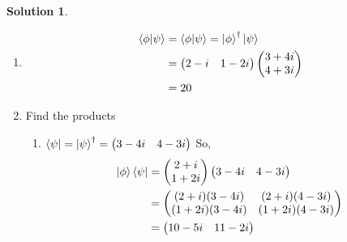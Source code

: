 \documentclass[10pt]{article}
\theoremstyle{definition}
\newtheorem{soln}{Solution}
\begin{document}
\begin{soln} ~
  \begin{enumerate}[label=(\alph*)]
    \item \begin{align*}
            \braket{\phi}{\psi} & = \braket{\phi}{\psi} = \ket{\phi}^\dagger \ket{\psi} \\
                                & = \begin{pmatrix}
                                      2-i & 1-2i
                                    \end{pmatrix}
            \begin{pmatrix}
              3+4i \\
              4+3i
            \end{pmatrix}                                                              \\
                                & = 20
          \end{align*}
    \item Find the products \begin{enumerate}[label=(\roman*)]
            \item $\bra{\psi}=\ket{\psi}^\dagger=\begin{pmatrix}
                      3-4i & 4-3i
                    \end{pmatrix}$ So,
                  \begin{align*}
                    \ket{\phi}\bra{\psi} & =
                    \begin{pmatrix}
                      2+i \\
                      1+2i
                    \end{pmatrix}
                    \begin{pmatrix}
                      3-4i & 4-3i
                    \end{pmatrix}              \\
                                         & =
                    \begin{pmatrix}
                      (2+i)(3-4i)  & (2+i)(4-3i)  \\
                      (1+2i)(3-4i) & (1+2i)(4-3i) \\
                    \end{pmatrix} \\
                                         & =
                    \begin{pmatrix}
                      10-5i & 11-2i \\

\end{pmatrix}
\end{align*}
\end{enumerate}
\end{enumerate}
\end{soln}
\end{document}
